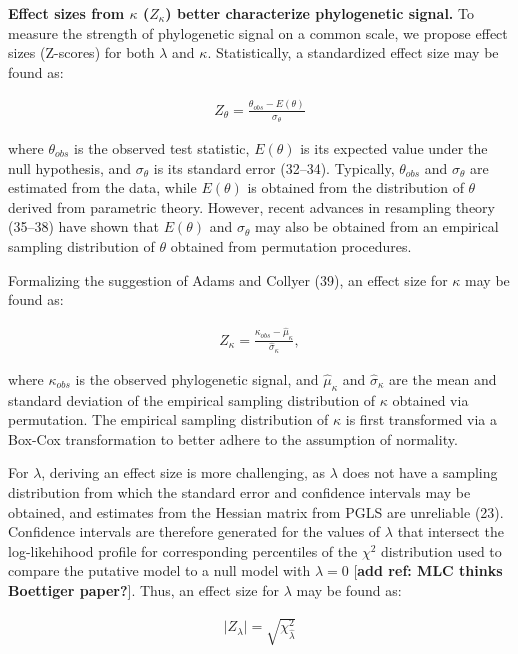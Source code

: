 \documentclass[9pt,twocolumn,twoside,lineno]{pnas-new}
\begin{document}
\textbf{Effect sizes from \(\kappa\) (\(Z_{\kappa}\)) better
characterize phylogenetic signal.} To measure the strength of
phylogenetic signal on a common scale, we propose effect sizes
(Z-scores) for both \(\lambda\) and \(\kappa\). Statistically, a
standardized effect size may be found as:

\begin{align}
    Z_{\theta}=\frac{\theta_{obs}-E(\theta)}{\sigma_\theta}
\end{align}

where \(\theta_{obs}\) is the observed test statistic, \(E(\theta)\) is
its expected value under the null hypothesis, and \(\sigma_\theta\) is
its standard error (32--34). Typically, \(\theta_{obs}\) and
\(\sigma_\theta\) are estimated from the data, while \(E(\theta)\) is
obtained from the distribution of \(\theta\) derived from parametric
theory. However, recent advances in resampling theory (35--38) have
shown that \(E(\theta)\) and \(\sigma_\theta\) may also be obtained from
an empirical sampling distribution of \(\theta\) obtained from
permutation procedures.

Formalizing the suggestion of Adams and Collyer (39), an effect size for
\(\kappa\) may be found as:

\begin{align}
    Z_\kappa=\frac{\kappa_{obs}-\hat\mu_{\kappa}}{\hat\sigma_{\kappa}},
\end{align}

where \(\kappa_{obs}\) is the observed phylogenetic signal, and
\(\hat\mu_\kappa\) and \(\hat\sigma_\kappa\) are the mean and standard
deviation of the empirical sampling distribution of \(\kappa\) obtained
via permutation. The empirical sampling distribution of \(\kappa\) is
first transformed via a Box-Cox transformation to better adhere to the
assumption of normality.

For \(\lambda\), deriving an effect size is more challenging, as
\(\lambda\) does not have a sampling distribution from which the
standard error and confidence intervals may be obtained, and estimates
from the Hessian matrix from PGLS are unreliable (23). Confidence
intervals are therefore generated for the values of \(\lambda\) that
intersect the log-likehihood profile for corresponding percentiles of
the \(\chi^2\) distribution used to compare the putative model to a null
model with \(\lambda = 0\) {[}\textbf{add ref: MLC thinks Boettiger
paper?}{]}. Thus, an effect size for \(\lambda\) may be found as:

\begin{align}
   \lvert Z_{\lambda} \rvert = \sqrt{\chi^2_{\hat{\lambda}}}
\end{align}
\end{document}
